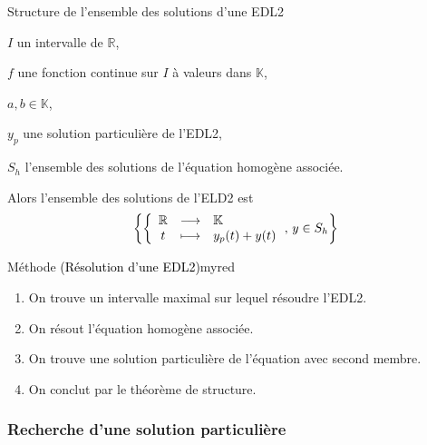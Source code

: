     \begin{theo}{Structure de l’ensemble des solutions d’une EDL2}{}
	    \begin{soient}
		    \item $I$ un intervalle de $\mathbb{R}$,
		    \item $f$ une fonction continue sur $I$ à valeurs dans $\mathbb{K}$,
		    \item $a,b \in \mathbb{K}$,
		    \item $y_{p}$ une solution particulière de l’EDL2,
		    \item $S_h$ l’ensemble des solutions de l’équation homogène associée.
	    \end{soient}
        Alors l’ensemble des solutions de l’ELD2 est 
        \[ \left\{ \application{\mathbb{R}}{\mathbb{K}}{t}{y_p(t) + y(t)}, \, y \in S_h \right\} \]
    \end{theo}

    \begin{omed}{Méthode \textcolor{black}{(Résolution d’une EDL2)}}{myred}
	    \begin{enumerate}
		    \item On trouve un intervalle maximal sur lequel résoudre l’EDL2.
		    \item On résout l’équation homogène associée.
		    \item On trouve une solution particulière de l’équation avec second membre.
		    \item On conclut par le théorème de structure.
	    \end{enumerate}
    \end{omed}

    \subsubsection{Recherche d’une solution particulière}

